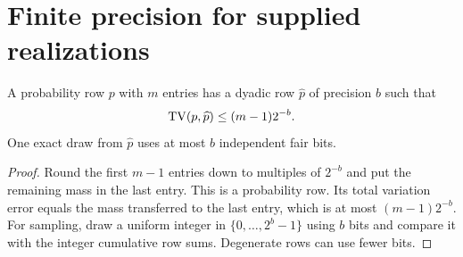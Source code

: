 \section{Finite precision for supplied realizations}
\begin{lemma}\label{lem:dyadic56}
A probability row $p$ with $m$ entries has a dyadic row $\widehat p$ of precision $b$ such that
\[
                   \operatorname{TV}(p,\widehat p)\le(m-1)2^{-b}.
\]
One exact draw from $\widehat p$ uses at most $b$ independent fair bits.
\end{lemma}
\begin{proof}
Round the first $m-1$ entries down to multiples of $2^{-b}$ and put the remaining mass in the last entry. This is a probability row. Its total variation error equals the mass transferred to the last entry, which is at most $(m-1)2^{-b}$. For sampling, draw a uniform integer in $\{0,\ldots,2^b-1\}$ using $b$ bits and compare it with the integer cumulative row sums. Degenerate rows can use fewer bits.
\end{proof}
